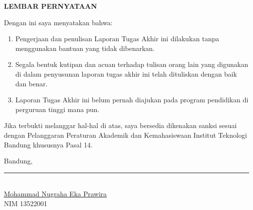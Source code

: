 \begin{center}
{\bfseries\large LEMBAR PERNYATAAN}
\end{center}

\vspace{0.5cm}

\noindent Dengan ini saya menyatakan bahwa:

\begin{enumerate}[label=\arabic*.,leftmargin=*]
  \item Pengerjaan dan penulisan Laporan Tugas Akhir ini dilakukan tanpa menggunakan bantuan yang tidak dibenarkan.
  \item Segala bentuk kutipan dan acuan terhadap tulisan orang lain yang digunakan di dalam penyusunan laporan tugas akhir ini telah dituliskan dengan baik dan benar.
  \item Laporan Tugas Akhir ini belum pernah diajukan pada program pendidikan di perguruan tinggi mana pun.
\end{enumerate}

\noindent Jika terbukti melanggar hal-hal di atas, saya bersedia dikenakan sanksi sesuai dengan Pelanggaran Peraturan Akademik dan Kemahasiswaan Institut Teknologi Bandung khususnya Pasal 14.

\vspace{2cm}

\begin{flushright}
Bandung, \rule{4cm}{0.4pt} \\[2cm]
\underline{Mohammad Nugraha Eka Prawira} \\
NIM 13522001
\end{flushright}

